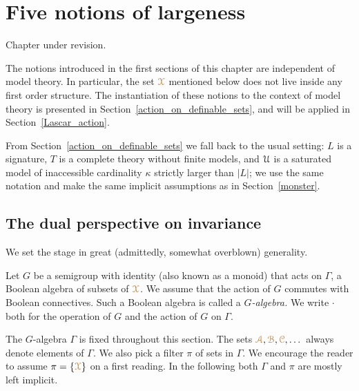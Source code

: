 \chapter{Five notions of largeness}
\label{actions}

\def\medrel#1{\parbox[t]{5ex}{$\displaystyle\hfil #1$}}
\def\ceq#1#2#3{\parbox[t]{17ex}{$\displaystyle #1$}\medrel{#2}{$\displaystyle #3$}}

\noindent\llap{\textcolor{red}{\Large\warning}\kern1.5ex}\ignorespaces
Chapter under revision.

The notions introduced in the first sections of this chapter are independent of model theory.
In particular, the set ${\color{brown}\EuScript X}$ mentioned below does not live inside any first order structure.
The instantiation of these notions to the context of model theory is presented in Section~\ref{action_on_definable_sets}, and will be applied in Section~\ref{Lascar_action}.

From Section~\ref{action_on_definable_sets} we fall back to the usual setting: $L$ is a signature, $T$ is a complete theory without finite models, and $\EuScript U$ is a saturated model of inaccessible cardinality $\kappa$ strictly larger than $|L|$; we use the same notation and make the same implicit assumptions as in Section~\ref{monster}.

\section{The dual perspective on invariance}\label{dual_perspective}

We set the stage in great (admittedly, somewhat overblown) generality.

Let \emph{$G$\/} be a semigroup with identity (also known as a monoid) that acts on $\Gamma$, a Boolean algebra of subsets of \emph{${\color{brown}\EuScript X}$.}
We assume that the action of $G$ commutes with Boolean connectives.
Such a Boolean algebra is called a \emph{$G$-algebra.}
We write ${\cdot}$ both for the operation of $G$ and the action of $G$ on $\Gamma$.

The $G$-algebra $\Gamma$ is fixed throughout this section.
The sets ${\color{brown}\EuScript A},{\color{brown}\EuScript B},{\color{brown}\EuScript C},\dots$ always denote elements of $\Gamma$.
We also pick a filter \emph{$\pi$\/} of sets in $\Gamma$.
We encourage the reader to assume $\pi=\{{\color{brown}\EuScript X}\}$ on a first reading.
In the following both $\Gamma$ and $\pi$ are mostly left implicit.

